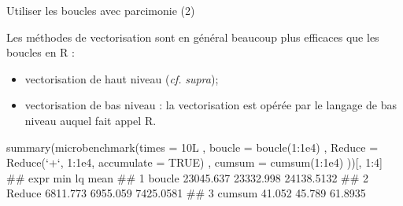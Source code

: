 \documentclass[12pt,ignorenonframetext,]{beamer}
\newenvironment{Shaded}{}{}
\newcommand{\DataTypeTok}[1]{#1}
\newcommand{\DecValTok}[1]{#1}
\newcommand{\FloatTok}[1]{#1}
\newcommand{\KeywordTok}[1]{\textcolor[rgb]{0.00,0.00,1.00}{#1}}
\newcommand{\NormalTok}[1]{#1}
\newcommand{\OperatorTok}[1]{#1}
\newcommand{\OtherTok}[1]{\textcolor[rgb]{1.00,0.25,0.00}{#1}}
\newcommand{\StringTok}[1]{\textcolor[rgb]{0.00,0.50,0.50}{#1}}
\providecommand{\tightlist}{%
  \setlength{\itemsep}{0pt}\setlength{\parskip}{0pt}}
\renewenvironment{Shaded}{\begin{snugshade}}{\end{snugshade}}
\begin{document}
\begin{frame}[fragile]{Utiliser les boucles avec parcimonie (2)}
\protect\hypertarget{utiliser-les-boucles-avec-parcimonie-2}{}

\small

Les méthodes de vectorisation sont en général beaucoup plus efficaces
que les boucles en R :

\begin{itemize}
\tightlist
\item
  vectorisation de haut niveau (\emph{cf.} \emph{supra});
\item
  vectorisation de bas niveau : la vectorisation est opérée par le
  langage de bas niveau auquel fait appel R.
\end{itemize}

\pause \footnotesize

\begin{Shaded}
\begin{Highlighting}[]
\KeywordTok{summary}\NormalTok{(}\KeywordTok{microbenchmark}\NormalTok{(}\DataTypeTok{times =}\NormalTok{ 10L}
\NormalTok{  , }\DataTypeTok{boucle =} \KeywordTok{boucle}\NormalTok{(}\DecValTok{1}\OperatorTok{:}\FloatTok{1e4}\NormalTok{)}
\NormalTok{  , }\DataTypeTok{Reduce =} \KeywordTok{Reduce}\NormalTok{(}\StringTok{`}\DataTypeTok{+}\StringTok{`}\NormalTok{, }\DecValTok{1}\OperatorTok{:}\FloatTok{1e4}\NormalTok{, }\DataTypeTok{accumulate =} \OtherTok{TRUE}\NormalTok{)}
\NormalTok{  , }\DataTypeTok{cumsum =} \KeywordTok{cumsum}\NormalTok{(}\DecValTok{1}\OperatorTok{:}\FloatTok{1e4}\NormalTok{)}
\NormalTok{))[, }\DecValTok{1}\OperatorTok{:}\DecValTok{4}\NormalTok{]}
\NormalTok{  ##     expr       min        lq       mean}
\NormalTok{  ## 1 boucle 23045.637 23332.998 24138.5132}
\NormalTok{  ## 2 Reduce  6811.773  6955.059  7425.0581}
\NormalTok{  ## 3 cumsum    41.052    45.789    61.8935}
\end{Highlighting}
\end{Shaded}

\end{frame}
\end{document}

